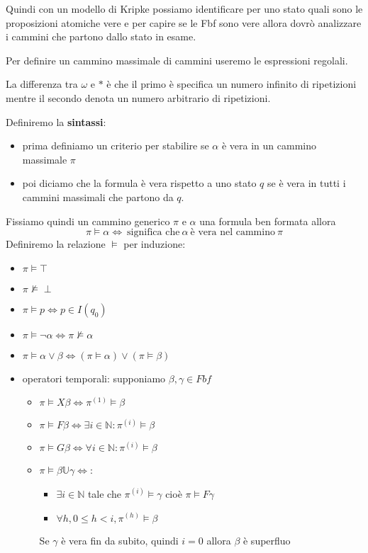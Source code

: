 Quindi con un modello di Kripke possiamo identificare per uno stato quali sono le
proposizioni atomiche vere e per capire se le Fbf sono vere allora dovrò analizzare
i cammini che partono dallo stato in esame.

\begin{nota}
    Per definire un cammino massimale di cammini useremo le espressioni regolali.
    
    La differenza tra $\omega$ e $\ast$ è che il primo è specifica un numero infinito
    di ripetizioni mentre il secondo denota un numero arbitrario di ripetizioni.
\end{nota}



Definiremo la \textbf{sintassi}:
\begin{itemize}
    \item prima definiamo un criterio per stabilire se $\alpha$ è vera in un cammino
    massimale $\pi$ 
    \item poi diciamo che la formula è vera rispetto a uno stato $q$ se è vera in tutti
    i cammini massimali che partono da $q$.
\end{itemize}

Fissiamo quindi un cammino generico $\pi$ e $\alpha$ una formula ben formata allora
\begin{equation}
    \pi \vDash \alpha \iff \ \text{significa che} \ \alpha \ \text{è vera nel cammino} \ \pi
\end{equation}
Definiremo la relazione $\vDash$ per induzione:
\begin{itemize}
    \item $\pi \vDash \top$
    \item $\pi \not\vDash \perp$
    \item $\pi \vDash p \iff p\in I(q_0)$
    \item $\pi \vDash \lnot \alpha \iff \pi \not\vDash \alpha$
    \item $\pi \vDash  \alpha \lor \beta \iff (\pi \vDash \alpha)\lor (\pi \vDash \beta) $
    \item operatori temporali: supponiamo $\beta, \gamma \in Fbf$
    \begin{itemize}
        \item $\pi\vDash X\beta \iff \pi^{(1)}\vDash \beta$
        \item $\pi\vDash F\beta \iff \exists i \in \mathbb{N}:\pi^{(i)}\vDash \beta$
        \item $\pi\vDash G\beta \iff \forall i \in \mathbb{N}:\pi^{(i)}\vDash \beta$
        \item $\pi \vDash \beta \mathbb{U} \gamma \iff$:
        \begin{itemize}
            \item $\exists i \in \mathbb{N}$ tale che $\pi^{(i)}\vDash \gamma$ cioè $\pi\vDash F\gamma$
            \item $\forall h, 0\le h < i, \pi^{(h)}\vDash \beta$
        \end{itemize}
        Se $\gamma$ è vera fin da subito, quindi $i=0$ allora $\beta$ è superfluo
    \end{itemize}
\end{itemize}